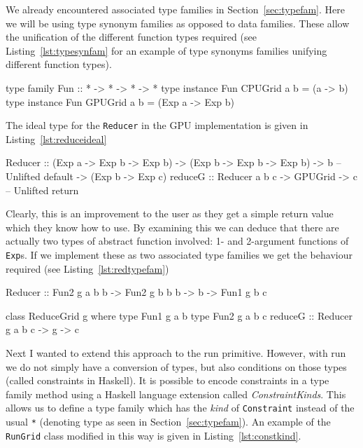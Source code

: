 \documentclass[
    12pt,
    a4paper,
    twoside,
    openright,
    ]{scrbook}
\begin{document}
We already encountered associated type families in
Section~\ref{sec:typefam}. Here we will be using type synonym families as
opposed to data families. These allow the unification of the different function
types required (see Listing~\ref{lst:typesynfam} for an example of type synonyms
families unifying different function types).

\begin{hflisting}[label=lst:typesynfam, caption=The type synonym family is used
  as a type function. It is used to work out the element type of a collection.
  Here the \texttt{Fun} family (representing a one-argument function) can take
  two forms depending on the compilation target.]

type family Fun :: * -> * -> * -> *
type instance Fun CPUGrid a b = (a -> b)
type instance Fun GPUGrid a b = (Exp a -> Exp b)

\end{hflisting}


The ideal type for the \texttt{Reducer} in the GPU implementation is given in
Listing~\ref{lst:reduceideal}

\begin{hflisting}[label={lst:reduceideal}, caption={The optimal type for the
    reduce primitive under Accelerate.}]
Reducer :: (Exp a -> Exp b -> Exp b)
        -> (Exp b -> Exp b -> Exp b)
        -> b -- Unlifted default
        -> (Exp b -> Exp c)
reduceG :: Reducer a b c -> GPUGrid -> c -- Unlifted return
\end{hflisting}

Clearly, this is an improvement to the user as they get a simple return value
which they know how to use. By examining this we can deduce that there are
actually two types of abstract function involved: 1- and 2-argument functions of
\texttt{Exp}s. If we implement these as two associated type families we get the
behaviour required (see Listing~\ref{lst:redtypefam})

\begin{hflisting}[label={lst:redtypefam}, caption={The application of type
    families to the reduce primitive.}]
Reducer :: Fun2 g a b b
        -> Fun2 g b b b
        -> b
        -> Fun1 g b c

class ReduceGrid g where
    type Fun1 g a b
    type Fun2 g a b c
    reduceG :: Reducer g a b c -> g -> c
\end{hflisting}

Next I wanted to extend this approach to the run primitive. However, with run we
do not simply have a conversion of types, but also conditions on those types
(called constraints in Haskell). It is possible to encode constraints in a type
family method using a Haskell language extension called
\emph{ConstraintKinds}. This allows us to define a type family which has the
\emph{kind} of \texttt{Constraint} instead of the usual \texttt{*} (denoting
type as seen in Section~\ref{sec:typefam}). An example of the \texttt{RunGrid}
class modified in this way is given in Listing~\ref{lst:constkind}.
\end{document}
